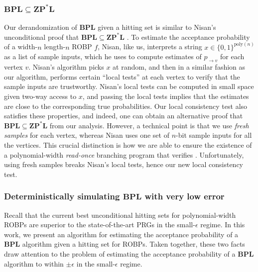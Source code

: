 \documentclass{toc}
\begin{document}
\subsubsection{$\mathbf{BPL}\subseteq \mathbf{ZP}^*\mathbf{L}$}
Our derandomization of $\mathbf{BPL}$ given a hitting set is similar to Nisan's unconditional proof that $\mathbf{BPL} \subseteq \mathbf{ZP}^* \mathbf{L}$ \cite{Nis93}. To estimate the acceptance probability of a width-$n$ length-$n$ ROBP $f$, Nisan, like us, interprets a string $x \in \{0, 1\}^{\text{poly}(n)}$ as a list of sample inputs, which he uses to compute estimates of $p_{\to v}$ for each vertex $v$. Nisan's algorithm picks $x$ at random, and then in a similar fashion as our algorithm, performs certain ``local tests'' at each vertex to verify that the sample inputs are trustworthy. Nisan's local tests can be computed in small space given two-way access to $x$, and passing the local tests implies that the estimates are close to the corresponding true probabilities. Our local consistency test also satisfies these properties, and indeed, one can obtain an alternative proof that $\mathbf{BPL} \subseteq \mathbf{ZP}^* \mathbf{L}$ from our analysis. However, a technical point is that we use \emph{fresh samples} for each vertex, whereas Nisan uses one set of $n$-bit sample inputs for all the vertices. This crucial distinction is how we are able to ensure the existence of a polynomial-width \emph{read-once} branching program that verifies . Unfortunately, using fresh samples breaks Nisan's local tests, hence our new local consistency test.

\subsubsection{Deterministically simulating $\mathbf{BPL}$ with very low error}

Recall that the current best unconditional hitting sets for polynomial-width ROBPs \cite{BCG20, HZ20, CL20, CDRSTS21, PV21, Hoz21} are superior to the state-of-the-art PRGs \cite{Nis92} in the small-$\epsilon$ regime. In this work, we present an algorithm for estimating the acceptance probability of a $\mathbf{BPL}$ algorithm given a hitting set for ROBPs. Taken together, these two facts draw attention to the problem of estimating the acceptance probability of a $\mathbf{BPL}$ algorithm to within $\pm \epsilon$ in the small-$\epsilon$ regime.
\end{document}

